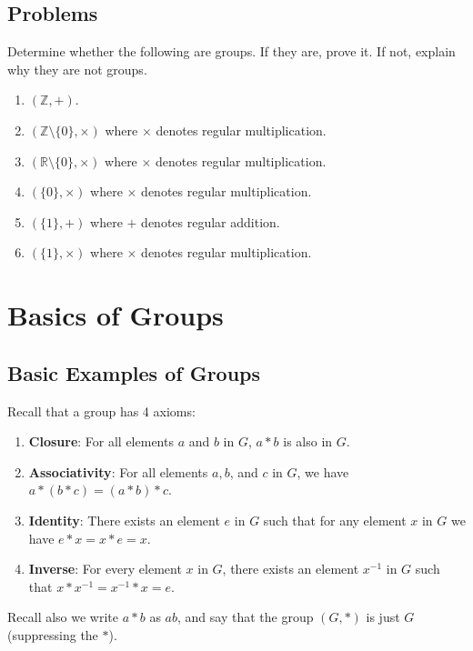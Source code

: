 \section{Problems}
\begin{problem}
Determine whether the following are groups. If they are, prove it. If not, explain why they are not groups.
\begin{enumerate}[label=(\alph*)]
    \item $(\mathbb{Z}, +)$.
    \item $(\mathbb{Z} \setminus \{0\}, \times)$ where $\times$ denotes regular multiplication.
    \item $(\mathbb{R} \setminus \{0\}, \times)$ where $\times$ denotes regular multiplication.
    \item $(\{0\}, \times)$ where $\times$ denotes regular multiplication.
    \item $(\{1\}, +)$ where $+$ denotes regular addition.
    \item $(\{1\}, \times)$ where $\times$ denotes regular multiplication.
\end{enumerate}
\end{problem}
\chapter{Basics of Groups}
\section{Basic Examples of Groups}
Recall that a group has 4 axioms:
\begin{enumerate}
    \item \textbf{Closure}: For all elements $a$ and $b$ in $G$, $a \ast b$ is also in $G$.
    \item \textbf{Associativity}: For all elements $a, b$, and $c$ in $G$, we have $a \ast (b \ast c) = (a \ast b) \ast c$.
    \item \textbf{Identity}: There exists an element $e$ in $G$ such that for any element $x$ in $G$ we have $e \ast x = x \ast e = x$.
    \item \textbf{Inverse}: For every element $x$ in $G$, there exists an element $x^{-1}$ in $G$ such that $x \ast x^{-1} = x^{-1} \ast x = e$.
\end{enumerate}

Recall also we write $a \ast b$ as $ab$, and say that the group $(G, \ast)$ is just $G$ (suppressing the $\ast$).

